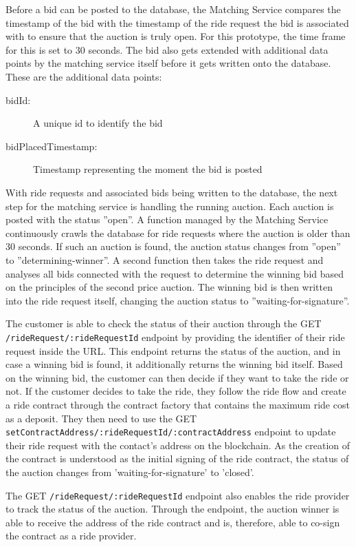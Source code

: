Before a bid can be posted to the database, the Matching Service compares the timestamp of the bid with the timestamp of the ride request the bid is associated with to ensure that the auction is truly open. For this prototype, the time frame for this is set to 30 seconds. The bid also gets extended with additional data points by the matching service itself before it gets written onto the database. These are the additional data points:

\begin{description}
    \item[bidId:] A unique id to identify the bid
    \item[bidPlacedTimestamp:] Timestamp representing the moment the bid is posted
\end{description}

With ride requests and associated bids being written to the database, the next step for the matching service is handling the running auction. Each auction is posted with the status ''open''. A function managed by the Matching Service continuously crawls the database for ride requests where the auction is older than 30 seconds. If such an auction is found, the auction status changes from ''open'' to ''determining-winner''. A second function then takes the ride request and analyses all bids connected with the request to determine the winning bid based on the principles of the second price auction. The winning bid is then written into the ride request itself, changing the auction status to ''waiting-for-signature''. 

The customer is able to check the status of their auction through the GET \texttt{/rideRequest/:rideRequestId} endpoint by providing the identifier of their ride request inside the URL. This endpoint returns the status of the auction, and in case a winning bid is found, it additionally returns the winning bid itself. Based on the winning bid, the customer can then decide if they want to take the ride or not. If the customer decides to take the ride, they follow the ride flow and create a ride contract through the contract factory that contains the maximum ride cost as a deposit. They then need to use the GET \texttt{setContractAddress/:rideRequestId/:contractAddress} endpoint to update their ride request with the contact's address on the blockchain. As the creation of the contract is understood as the initial signing of the ride contract, the status of the auction changes from 'waiting-for-signature' to 'closed'. 

The GET \texttt{/rideRequest/:rideRequestId} endpoint also enables the ride provider to track the status of the auction. Through the endpoint, the auction winner is able to receive the address of the ride contract and is, therefore, able to co-sign the contract as a ride provider.

